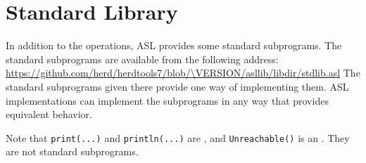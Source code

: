 \chapter{Standard Library\label{chap:StandardLibrary}}

In addition to the operations, ASL provides some standard subprograms.
The standard subprograms are available from the following address:
\url{https://github.com/herd/herdtools7/blob/\VERSION/asllib/libdir/stdlib.asl}
The standard subprograms given there provide one way of implementing them.
ASL implementations can implement the subprograms in any way that provides equivalent behavior.

Note that \verb|print(...)| and \verb|println(...)| are \printstatementsterm{},
and \verb|Unreachable()| is an \unreachablestatementterm{}.
They are not standard subprograms.
